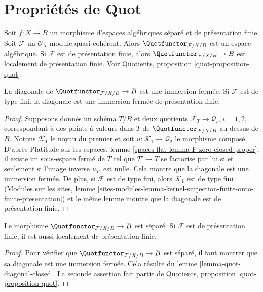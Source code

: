 \section{Propriétés de Quot}
\label{section-quot}

\noindent
Soit $f : X \to B$ un morphisme d'espaces algébriques séparé et de
présentation finie. Soit $\mathcal{F}$ un $\mathcal{O}_X$-module
quasi-cohérent. Alors $\Quotfunctor_{\mathcal{F}/X/B}$ est un espace
algébrique. Si $\mathcal{F}$ est de présentation finie, alors
$\Quotfunctor_{\mathcal{F}/X/B} \to B$ est localement de présentation
finie. Voir Quotients, proposition \ref{quot-proposition-quot}.

\begin{lemma}
\label{lemma-quot-diagonal-closed}
La diagonale de $\Quotfunctor_{\mathcal{F}/X/B} \to B$ est une immersion
fermée. Si $\mathcal{F}$ est de type fini, la diagonale est une immersion
fermée de présentation finie.
\end{lemma}

\begin{proof}
Supposons donnés un schéma $T/B$ et deux quotients
$\mathcal{F}_T \to \mathcal{Q}_i$, $i = 1, 2$, correspondant à des points
à valeurs dans $T$ de $\Quotfunctor_{\mathcal{F}/X/B}$ au-dessus de $B$.
Notons $\mathcal{K}_1$ le noyau du premier et soit
$u : \mathcal{K}_1 \to \mathcal{Q}_2$ le morphisme composé.
D'après Platitude sur les espaces, lemme
\ref{spaces-flat-lemma-F-zero-closed-proper}, il existe un sous-espace fermé
de $T$ tel que $T' \to T$ se factorise par lui si et seulement si l'image
inverse $u_{T'}$ est nulle. Cela montre que la diagonale est une immersion
fermée. De plus, si $\mathcal{F}$ est de type fini, alors
$\mathcal{K}_1$ est de type fini (Modules sur les sites, lemme
\ref{sites-modules-lemma-kernel-surjection-finite-onto-finite-presentation})
et le même lemme montre que la diagonale est de présentation finie.
\end{proof}

\begin{lemma}
\label{lemma-quot-s-lfp}
Le morphisme $\Quotfunctor_{\mathcal{F}/X/B} \to B$ est séparé.
Si $\mathcal{F}$ est de présentation finie, il est aussi localement de
présentation finie.
\end{lemma}

\begin{proof}
Pour vérifier que $\Quotfunctor_{\mathcal{F}/X/B} \to B$ est séparé, il
faut montrer que sa diagonale est une immersion fermée. Cela résulte du
lemme \ref{lemma-quot-diagonal-closed}. La seconde assertion fait partie
de Quotients, proposition \ref{quot-proposition-quot}.
\end{proof}

